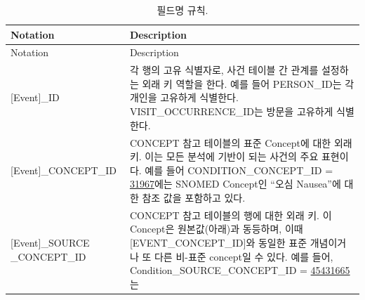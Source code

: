 \documentclass[11pt]{book}
\theoremstyle{definition}
\theoremstyle{definition}
\theoremstyle{definition}
\theoremstyle{remark}
\begin{document}
\begin{longtable}[]{@{}ll@{}}
\caption{\label{tab:fieldConventions} 필드명 규칙.}\tabularnewline
\toprule
\begin{minipage}[b]{0.34\columnwidth}\raggedright\strut
Notation\strut
\end{minipage} & \begin{minipage}[b]{0.60\columnwidth}\raggedright\strut
Description\strut
\end{minipage}\tabularnewline
\midrule
\endfirsthead
\toprule
\begin{minipage}[b]{0.34\columnwidth}\raggedright\strut
Notation\strut
\end{minipage} & \begin{minipage}[b]{0.60\columnwidth}\raggedright\strut
Description\strut
\end{minipage}\tabularnewline
\midrule
\endhead
\begin{minipage}[t]{0.34\columnwidth}\raggedright\strut
{[}Event{]}\_ID\strut
\end{minipage} & \begin{minipage}[t]{0.60\columnwidth}\raggedright\strut
각 행의 고유 식별자로, 사건 테이블 간 관계를 설정하는 외래 키 역할을
한다. 예를 들어 PERSON\_ID는 각 개인을 고유하게 식별한다.
VISIT\_OCCURRENCE\_ID는 방문을 고유하게 식별한다.\strut
\end{minipage}\tabularnewline
\begin{minipage}[t]{0.34\columnwidth}\raggedright\strut
{[}Event{]}\_CONCEPT\_ID\strut
\end{minipage} & \begin{minipage}[t]{0.60\columnwidth}\raggedright\strut
CONCEPT 참고 테이블의 표준 Concept에 대한 외래 키. 이는 모든 분석에
기반이 되는 사건의 주요 표현이다. 예를 들어 CONDITION\_CONCEPT\_ID =
\href{http://athena.ohdsi.org/search-terms/terms/31967}{31967}에는
SNOMED Concept인 ``오심 Nausea''에 대한 참조 값을 포함하고 있다.\strut
\end{minipage}\tabularnewline
\begin{minipage}[t]{0.34\columnwidth}\raggedright\strut
{[}Event{]}\_SOURCE \_CONCEPT\_ID\strut
\end{minipage} & \begin{minipage}[t]{0.60\columnwidth}\raggedright\strut
CONCEPT 참고 테이블의 행에 대한 외래 키. 이 Concept은 원본값(아래)과
동등하며, 이때 {[}EVENT\_CONCEPT\_ID{]}와 동일한 표준 개념이거나 또 다른
비-표준 concept일 수 있다. 예를 들어, Condition\_SOURCE\_CONCEPT\_ID =
\href{http://athena.ohdsi.org/search-terms/terms/45431665}{45431665}는

\end{minipage}
\end{longtable}
\end{document}
